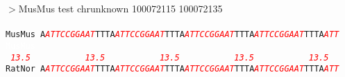 \documentclass[11pt,twoside,reqno,a4paper]{article}
\begin{document}
\noindent
$>$MusMus	test	chrunknown	100072115	100072135 \\
 \\
\texttt{MusMus	A\textit{\textcolor{red}{A}}\textit{\textcolor{red}{T}}\textit{\textcolor{red}{T}}\textit{\textcolor{red}{C}}\textit{\textcolor{red}{C}}\textit{\textcolor{red}{G}}\textit{\textcolor{red}{G}}\textit{\textcolor{red}{A}}\textit{\textcolor{red}{A}}\textit{\textcolor{red}{T}}TTTA\textit{\textcolor{red}{A}}\textit{\textcolor{red}{T}}\textit{\textcolor{red}{T}}\textit{\textcolor{red}{C}}\textit{\textcolor{red}{C}}\textit{\textcolor{red}{G}}\textit{\textcolor{red}{G}}\textit{\textcolor{red}{A}}\textit{\textcolor{red}{A}}\textit{\textcolor{red}{T}}TTTA\textit{\textcolor{red}{A}}\textit{\textcolor{red}{T}}\textit{\textcolor{red}{T}}\textit{\textcolor{red}{C}}\textit{\textcolor{red}{C}}\textit{\textcolor{red}{G}}\textit{\textcolor{red}{G}}\textit{\textcolor{red}{A}}\textit{\textcolor{red}{A}}\textit{\textcolor{red}{T}}TTTA\textit{\textcolor{red}{A}}\textit{\textcolor{red}{T}}\textit{\textcolor{red}{T}}\textit{\textcolor{red}{C}}\textit{\textcolor{red}{C}}\textit{\textcolor{red}{G}}\textit{\textcolor{red}{G}}\textit{\textcolor{red}{A}}\textit{\textcolor{red}{A}}\textit{\textcolor{red}{T}}TTTA\textit{\textcolor{red}{A}}\textit{\textcolor{red}{T}}\textit{\textcolor{red}{T}}\\
\textcolor{white}{MusMus	}\ \textit{\textcolor{red}{13.5}}\ \ \ \ \ \ \ \ \ \ \ \textit{\textcolor{red}{13.5}}\ \ \ \ \ \ \ \ \ \ \ \textit{\textcolor{red}{13.5}}\ \ \ \ \ \ \ \ \ \ \ \textit{\textcolor{red}{13.5}}\ \ \ \ \ \ \ \ \ \ \ \textit{\textcolor{red}{13.5}}\\
RatNor	A\textit{\textcolor{red}{A}}\textit{\textcolor{red}{T}}\textit{\textcolor{red}{T}}\textit{\textcolor{red}{C}}\textit{\textcolor{red}{C}}\textit{\textcolor{red}{G}}\textit{\textcolor{red}{G}}\textit{\textcolor{red}{A}}\textit{\textcolor{red}{A}}\textit{\textcolor{red}{T}}TTTA\textit{\textcolor{red}{A}}\textit{\textcolor{red}{T}}\textit{\textcolor{red}{T}}\textit{\textcolor{red}{C}}\textit{\textcolor{red}{C}}\textit{\textcolor{red}{G}}\textit{\textcolor{red}{G}}\textit{\textcolor{red}{A}}\textit{\textcolor{red}{A}}\textit{\textcolor{red}{T}}TTTA\textit{\textcolor{red}{A}}\textit{\textcolor{red}{T}}\textit{\textcolor{red}{T}}\textit{\textcolor{red}{C}}\textit{\textcolor{red}{C}}\textit{\textcolor{red}{G}}\textit{\textcolor{red}{G}}\textit{\textcolor{red}{A}}\textit{\textcolor{red}{A}}\textit{\textcolor{red}{T}}TTTA\textit{\textcolor{red}{A}}\textit{\textcolor{red}{T}}\textit{\textcolor{red}{T}}\textit{\textcolor{red}{C}}\textit{\textcolor{red}{C}}\textit{\textcolor{red}{G}}\textit{\textcolor{red}{G}}\textit{\textcolor{red}{A}}\textit{\textcolor{red}{A}}\textit{\textcolor{red}{T}}TTTA\textit{\textcolor{red}{A}}\textit{\textcolor{red}{T}}\textit{\textcolor{red}{T}}\\
}
\end{document}
